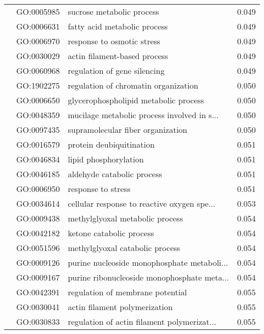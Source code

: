\begin{longtable}{lllr}
   & GO:0005985 &                    sucrose metabolic process &         0.049 \\
   & GO:0006631 &                 fatty acid metabolic process &         0.049 \\
   & GO:0006970 &                   response to osmotic stress &         0.049 \\
   & GO:0030029 &                 actin filament-based process &         0.049 \\
   & GO:0060968 &                 regulation of gene silencing &         0.049 \\
   & GO:1902275 &         regulation of chromatin organization &         0.050 \\
   & GO:0006650 &        glycerophospholipid metabolic process &         0.050 \\
   & GO:0048359 &  mucilage metabolic process involved in s... &         0.050 \\
   & GO:0097435 &            supramolecular fiber organization &         0.050 \\
   & GO:0016579 &                     protein deubiquitination &         0.051 \\
   & GO:0046834 &                        lipid phosphorylation &         0.051 \\
   & GO:0046185 &                   aldehyde catabolic process &         0.051 \\
   & GO:0006950 &                           response to stress &         0.051 \\
   & GO:0034614 &  cellular response to reactive oxygen spe... &         0.053 \\
   & GO:0009438 &              methylglyoxal metabolic process &         0.054 \\
   & GO:0042182 &                     ketone catabolic process &         0.054 \\
   & GO:0051596 &              methylglyoxal catabolic process &         0.054 \\
   & GO:0009126 &  purine nucleoside monophosphate metaboli... &         0.054 \\
   & GO:0009167 &  purine ribonucleoside monophosphate meta... &         0.054 \\
   & GO:0042391 &             regulation of membrane potential &         0.055 \\
   & GO:0030041 &                actin filament polymerization &         0.055 \\
   & GO:0030833 &  regulation of actin filament polymerizat... &         0.055 \\

\end{longtable}
